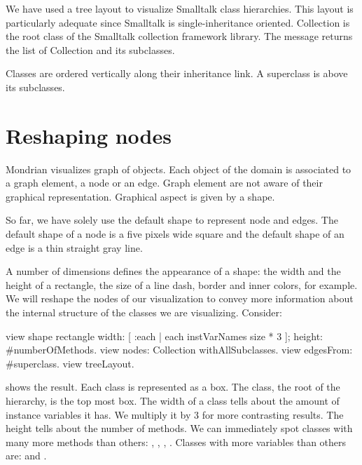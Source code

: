 \documentclass[a4paper,10pt,twoside]{book}
\begin{document}
We have used a tree layout to visualize Smalltalk class hierarchies. This layout is particularly adequate since Smalltalk is single-inheritance oriented. Collection is the root class of the Smalltalk collection framework library. The message  returns the list of Collection and its subclasses.

Classes are ordered vertically along their inheritance link. A superclass is above its subclasses. 


\section{Reshaping nodes}

Mondrian visualizes graph of objects. Each object of the domain is associated to a graph element, a node or an edge. Graph element are not aware of their graphical representation. Graphical aspect is given by a shape. 

So far, we have solely use the default shape to represent node and edges. The default shape of a node is a five pixels wide square and the default shape of an edge is a thin straight gray line.

A number of dimensions defines the appearance of a shape: the width and the height of a rectangle, the size of a line dash, border and inner colors, for example. We will reshape the nodes of our visualization to convey more information about the internal structure of the classes we are visualizing. Consider:

\begin{code}{}
view shape rectangle
	width: [ :each | each instVarNames size * 3 ];
	height: #numberOfMethods.
view nodes: Collection withAllSubclasses.
view edgesFrom: #superclass.
view treeLayout.
\end{code}

 shows the result. Each class is represented as a box. The  class, the root of the hierarchy, is the top most box. The width of a class tells about the amount of instance variables it has. We multiply it by 3 for more contrasting results. The height tells about the number of methods. We can immediately spot classes with many more methods than others: , , , . Classes with more variables than others are:  and .
\end{document}
